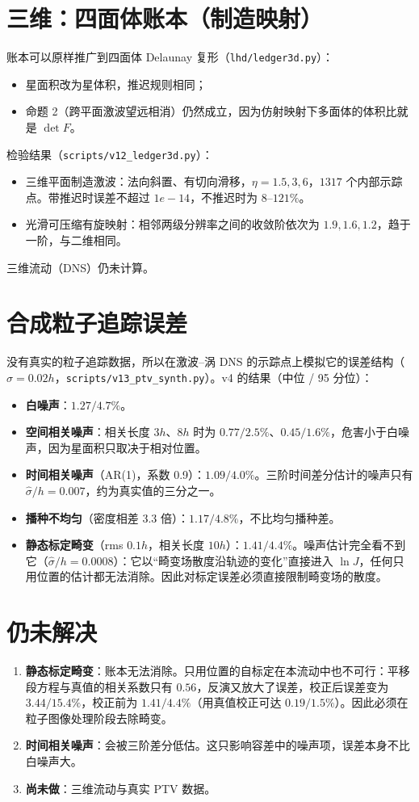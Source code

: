 \section{三维：四面体账本（制造映射）}
账本可以原样推广到四面体 Delaunay 复形（\texttt{lhd/ledger3d.py}）：
\begin{itemize}
\item 星面积改为星体积，推迟规则相同；
\item 命题 2（跨平面激波望远相消）仍然成立，因为仿射映射下多面体的体积比就是 $\det F$。
\end{itemize}
检验结果（\texttt{scripts/v12\_ledger3d.py}）：
\begin{itemize}
\item 三维平面制造激波：法向斜置、有切向滑移，$\eta=1.5,3,6$，$1317$ 个内部示踪点。带推迟时误差不超过 $1e-14$，不推迟时为 $8\mbox{--}121\%$。
\item 光滑可压缩有旋映射：相邻两级分辨率之间的收敛阶依次为 $1.9, 1.6, 1.2$，趋于一阶，与二维相同。
\end{itemize}
三维流动（DNS）仍未计算。

\section{合成粒子追踪误差}
没有真实的粒子追踪数据，所以在激波–涡 DNS 的示踪点上模拟它的误差结构（$\sigma=0.02h$，\texttt{scripts/v13\_ptv\_synth.py}）。v4 的结果（中位 / 95 分位）：
\begin{itemize}
\item \textbf{白噪声}：$1.27 / 4.7\%$。
\item \textbf{空间相关噪声}：相关长度 $3h$、$8h$ 时为 $0.77 / 2.5\%$、$0.45 / 1.6\%$，危害小于白噪声，因为星面积只取决于相对位置。
\item \textbf{时间相关噪声}（AR(1)，系数 0.9）：$1.09 / 4.0\%$。三阶时间差分估计的噪声只有 $\hat\sigma/h=0.007$，约为真实值的三分之一。
\item \textbf{播种不均匀}（密度相差 3.3 倍）：$1.17 / 4.8\%$，不比均匀播种差。
\item \textbf{静态标定畸变}（rms $0.1h$，相关长度 $10h$）：$1.41 / 4.4\%$。噪声估计完全看不到它（$\hat\sigma/h=0.0008$）：它以“畸变场散度沿轨迹的变化”直接进入 $\ln J$，任何只用位置的估计都无法消除。因此对标定误差必须直接限制畸变场的散度。
\end{itemize}

\section{仍未解决}
\begin{enumerate}
\item \textbf{静态标定畸变}：账本无法消除。只用位置的自标定在本流动中也不可行：平移段方程与真值的相关系数只有 $0.56$，反演又放大了误差，校正后误差变为 $3.44 / 15.4\%$，校正前为 $1.41 / 4.4\%$（用真值校正可达 $0.19 / 1.5\%$）。因此必须在粒子图像处理阶段去除畸变。
\item \textbf{时间相关噪声}：会被三阶差分低估。这只影响容差中的噪声项，误差本身不比白噪声大。
\item \textbf{尚未做}：三维流动与真实 PTV 数据。
\end{enumerate}

